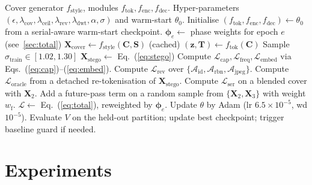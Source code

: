 \documentclass[conference]{IEEEtran}
\begin{document}
\begin{algorithm}[t]
\caption{Frequency-guided semantic steganography training.}
\label{alg:train}
\begin{algorithmic}[1]
\Require Cover generator $f_{\text{style}}$, modules $f_{\text{tok}}, f_{\text{enc}}, f_{\text{dec}}$.
\Require Hyper-parameters $(\epsilon, \lambda_{\text{cov}}, \lambda_{\text{ceil}}, \lambda_{\text{rev}}, \lambda_{\text{dwt}}, \alpha,\sigma)$ and warm-start $\theta_{0}$.
\State Initialise $(f_{\text{tok}}, f_{\text{enc}}, f_{\text{dec}})\leftarrow\theta_{0}$ from a serial-aware warm-start checkpoint.
    \State $\boldsymbol{\phi}_{e}\gets$ phase weights for epoch $e$ (see~\ref{sec:total})
        \State $\mathbf{X}_{\text{cover}}\gets f_{\text{style}}(\mathbf{C},\mathbf{S})$ (cached)
        \State $(\mathbf{z},\mathbf{T})\gets f_{\text{tok}}(\mathbf{C})$
        \State Sample $\sigma_{\text{train}}\!\in\![1.02,1.30]$
        \State $\mathbf{X}_{\text{stego}}\gets$ Eq.~(\ref{eq:stego})
        \State Compute $\mathcal{L}_{\text{cap}}, \mathcal{L}_{\text{freq}}, \mathcal{L}_{\text{embed}}$ via Eqs.~(\ref{eq:cap})--(\ref{eq:embed}).
        \State Compute $\mathcal{L}_{\text{rev}}$ over $\{\mathcal{A}_{\text{id}},\mathcal{A}_{\text{rbn}},\mathcal{A}_{\text{jpeg}}\}$.
        \State Compute $\mathcal{L}_{\text{oracle}}$ from a detached re-tokenisation of $\mathbf{X}_{\text{stego}}$.
        \State Compute $\mathcal{L}_{\text{ser}}$ on a blended cover with $\mathbf{X}_{2}$.
            \State Add a future-pass term on a random sample from $\{\mathbf{X}_{2},\mathbf{X}_{3}\}$ with weight $w_{\text{f}}$.
        \EndIf
        \State $\mathcal{L}\gets$ Eq.~(\ref{eq:total}), reweighted by $\boldsymbol{\phi}_{e}$.
        \State Update $\theta$ by Adam (lr $6.5\!\times\!10^{-5}$, wd $10^{-5}$).
    \EndFor
    \State Evaluate $V$ on the held-out partition; update best checkpoint; trigger baseline guard if needed.
\EndFor
\end{algorithmic}
\end{algorithm}

\section{Experiments}
\label{sec:exp}
\end{document}

